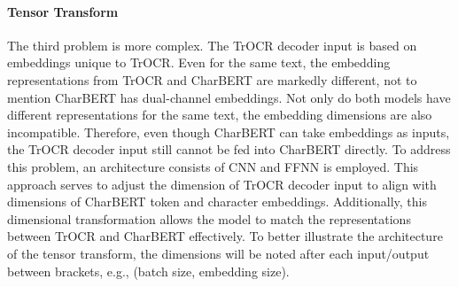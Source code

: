\paragraph*{Tensor Transform}
\label{par:3_tensor_transform}
The third problem is more complex. The TrOCR decoder input is based on embeddings unique to TrOCR. Even for the same text, the embedding representations from TrOCR and CharBERT are markedly different, not to mention CharBERT has dual-channel embeddings. Not only do both models have different representations for the same text, the embedding dimensions are also incompatible. Therefore, even though CharBERT can take embeddings as inputs, the TrOCR decoder input still cannot be fed into CharBERT directly. To address this problem, an architecture consists of CNN and FFNN is employed. This approach serves to adjust the dimension of TrOCR decoder input to align with dimensions of CharBERT token and character embeddings. Additionally, this dimensional transformation allows the model to match the representations between TrOCR and CharBERT effectively. To better illustrate the architecture of the tensor transform, the dimensions will be noted after each input/output between brackets, e.g., (batch size, embedding size).

